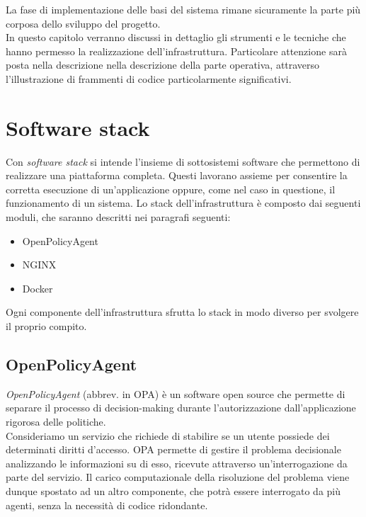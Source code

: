 La fase di implementazione delle basi del sistema rimane sicuramente la parte più corposa dello sviluppo del progetto.
\\ In questo capitolo verranno discussi in dettaglio gli strumenti e le tecniche
che hanno permesso la realizzazione dell'infrastruttura. Particolare attenzione sarà posta nella descrizione 
nella descrizione della parte operativa, attraverso l'illustrazione di frammenti di codice particolarmente significativi. 

\section{Software stack}
Con \textit{software stack} si intende l'insieme di sottosistemi software che permettono di realizzare una piattaforma completa.
Questi lavorano assieme per consentire la corretta esecuzione di un'applicazione oppure, come nel caso in questione, il 
funzionamento di un sistema.
Lo stack dell'infrastruttura è composto dai seguenti moduli, che saranno descritti nei paragrafi seguenti:
\begin{itemize}
    \item OpenPolicyAgent
    \item NGINX
    \item Docker
\end{itemize}
Ogni componente dell'infrastruttura sfrutta lo stack in modo diverso per svolgere il proprio compito. 


\subsection{OpenPolicyAgent}
\textit{OpenPolicyAgent} (abbrev. in OPA) è un software open source che permette di separare il processo di decision-making 
durante l'autorizzazione dall'applicazione rigorosa delle politiche.
\\ Consideriamo un servizio che richiede di stabilire se un utente possiede dei determinati diritti d'accesso.
OPA permette di gestire il problema decisionale analizzando le informazioni su di esso, ricevute attraverso un'interrogazione da parte del servizio. 
Il carico computazionale della risoluzione del problema viene dunque spostato ad un altro componente, che potrà essere interrogato da più 
agenti, senza la necessità di codice ridondante. 

